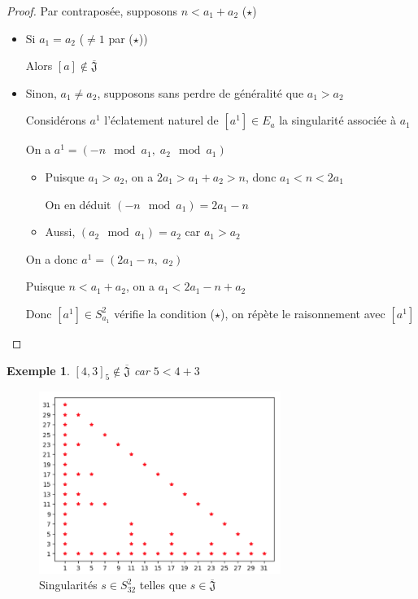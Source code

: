 \documentclass{article}
\newtheorem{example}{Exemple}
\begin{document}
\begin{proof}
    Par contraposée, supposons $n < a_1 + a_2$ ($\star$)

    \begin{itemize}
        \item Si $a_1 = a_2$ ($\neq 1$ par ($\star$))

            Alors $[a] \not \in \overline{\mathfrak{J}}$
        \item Sinon, $a_1 \neq a_2$, supposons sans perdre de généralité que $a_1 > a_2$

            Considérons $a^1$ l'éclatement naturel de $[a^1] \in E_a$ la singularité associée à $a_1$

            On a $a^1 = (-n \mod a_1,\; a_2 \mod a_1)$

            \begin{itemize}
                \item Puisque $a_1 > a_2$, on a $2a_1 > a_1 + a_2 > n$, donc $a_1 < n < 2a_1$
                    
                On en déduit $(-n \mod a_1) = 2a_1 - n$

                \item Aussi, $(a_2 \mod a_1) = a_2$ car $a_1 > a_2$
            \end{itemize}

            On a donc $a^1 = (2a_1-n,\; a_2)$

            Puisque $n < a_1 + a_2$, on a $a_1 < 2a_1 - n + a_2$

            Donc $[a^1] \in S_{a_1}^2$ vérifie la condition ($\star$), on répète le raisonnement avec $[a^1]$
    \end{itemize}
\end{proof}

\begin{example}
    ${[4, 3]}_5 \not \in \overline{\mathfrak{J}}$ car $5 < 4 + 3$
\end{example}

\begin{figure}[h]
    \caption{Singularités $s \in S_{32}^2$ telles que $s \in \overline{\mathfrak{J}}$}
    \centering
    \includegraphics[width=0.7\textwidth]{singularite_j_strict_m2_n32}
\end{figure}
\end{document}
